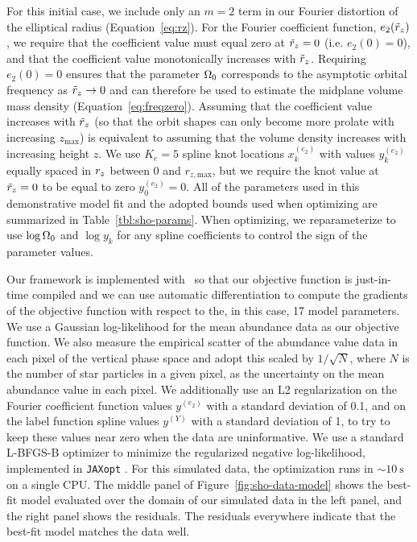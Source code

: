 For this initial case, we include only an $m=2$ term in our Fourier distortion of the
elliptical radius (Equation~\ref{eq:rz}).
For the Fourier coefficient function, $e_2(\tilde{r}_z)$, we require that the coefficient value
must equal zero at $\tilde{r}_z = 0$ (i.e. $e_2(0) = 0$), and that the coefficient value
monotonically increases with $\tilde{r}_z$.
Requiring $e_2(0) = 0$ ensures that the parameter $\Omega_0$ corresponds to the
asymptotic orbital frequency as $\tilde{r}_z \rightarrow 0$ and can therefore be used to
estimate the midplane volume mass density (Equation~\ref{eq:freqzero}).
Assuming that the coefficient value increases with $\tilde{r}_z$ (so that the orbit shapes
can only become more prolate with increasing $z_{\textrm{max}}$) is equivalent to
assuming that the volume density increases with increasing height $z$.
We use $K_e=5$ spline knot locations $x_k^{(e_2)}$ with values $y_k^{(e_2)}$ equally
spaced in $r_z$ between $0$ and $r_{z, \textrm{max}}$, but we require the knot value at
$\tilde{r}_z = 0$ to be equal to zero $y_0^{(e_2)}=0$.
All of the parameters used in this demonstrative model fit and the adopted bounds used
when optimizing are summarized in Table~\ref{tbl:sho-params}.
When optimizing, we reparameterize to use $\log \Omega_0$ and $\log y_k$ for any spline
coefficients to control the sign of the parameter values.

Our framework is implemented with \jax\ so that our objective function is just-in-time
compiled and we can use automatic differentiation to compute the gradients of the
objective function with respect to the, in this case, 17 model parameters.
We use a Gaussian log-likelihood for the mean  abundance data as our
objective function.
We also measure the empirical scatter of the abundance value data in each pixel of the
vertical phase space and adopt this scaled by $1/\sqrt{N}$, where $N$ is the number of
star particles in a given pixel, as the uncertainty on the mean abundance value in each
pixel.
We additionally use an L2 regularization on the Fourier coefficient function values
$y^{(e_2)}$ with a standard deviation of 0.1, and on the label function spline values
$y^{(Y)}$ with a standard deviation of 1, to try to keep these values near zero when the
data are uninformative.
We use a standard L-BFGS-B optimizer \citep{Byrd:1995} to minimize the regularized
negative log-likelihood, implemented in \texttt{JAXopt} \cite{jaxopt:2021}.
For this simulated data, the optimization runs in $\sim 10~\unit{\second}$ on a single
CPU.
The middle panel of Figure~\ref{fig:sho-data-model} shows the best-fit model evaluated
over the domain of our simulated data in the left panel, and the right panel shows the
residuals.
The residuals everywhere indicate that the best-fit model matches the data well.

